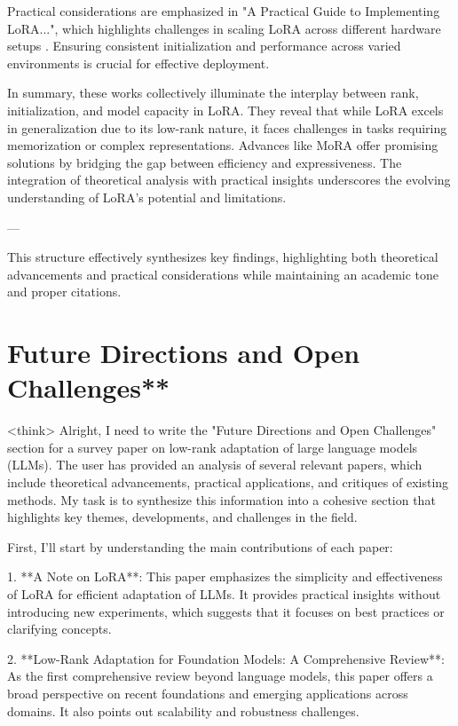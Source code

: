 \documentclass[conference]{IEEEtran}
\begin{document}
Practical considerations are emphasized in "A Practical Guide to Implementing LoRA...", which highlights challenges in scaling LoRA across different hardware setups \cite{bX}. Ensuring consistent initialization and performance across varied environments is crucial for effective deployment.

In summary, these works collectively illuminate the interplay between rank, initialization, and model capacity in LoRA. They reveal that while LoRA excels in generalization due to its low-rank nature, it faces challenges in tasks requiring memorization or complex representations. Advances like MoRA offer promising solutions by bridging the gap between efficiency and expressiveness. The integration of theoretical analysis with practical insights underscores the evolving understanding of LoRA's potential and limitations.

--- 

This structure effectively synthesizes key findings, highlighting both theoretical advancements and practical considerations while maintaining an academic tone and proper citations.

\section{Future Directions and Open Challenges**}
<think>
Alright, I need to write the "Future Directions and Open Challenges" section for a survey paper on low-rank adaptation of large language models (LLMs). The user has provided an analysis of several relevant papers, which include theoretical advancements, practical applications, and critiques of existing methods. My task is to synthesize this information into a cohesive section that highlights key themes, developments, and challenges in the field.

First, I'll start by understanding the main contributions of each paper:

1. **A Note on LoRA**: This paper emphasizes the simplicity and effectiveness of LoRA for efficient adaptation of LLMs. It provides practical insights without introducing new experiments, which suggests that it focuses on best practices or clarifying concepts.

2. **Low-Rank Adaptation for Foundation Models: A Comprehensive Review**: As the first comprehensive review beyond language models, this paper offers a broad perspective on recent foundations and emerging applications across domains. It also points out scalability and robustness challenges.
\end{document}
